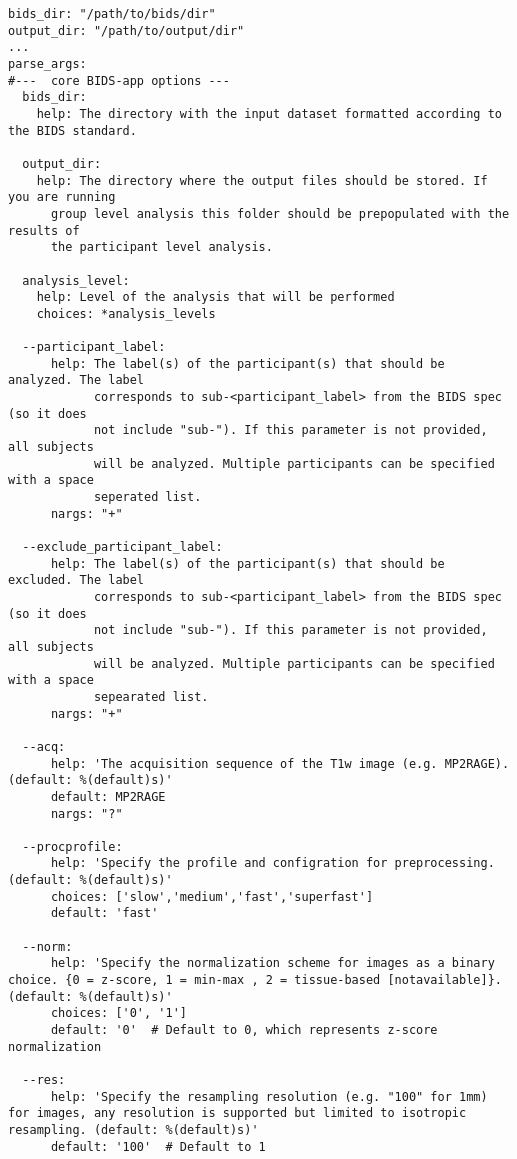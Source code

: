 \begin{verbatim}
bids_dir: "/path/to/bids/dir"
output_dir: "/path/to/output/dir"
...
parse_args:
#---  core BIDS-app options ---
  bids_dir:
    help: The directory with the input dataset formatted according to the BIDS standard.
  
  output_dir:
    help: The directory where the output files should be stored. If you are running
      group level analysis this folder should be prepopulated with the results of
      the participant level analysis.
      
  analysis_level:
    help: Level of the analysis that will be performed
    choices: *analysis_levels

  --participant_label:
      help: The label(s) of the participant(s) that should be analyzed. The label
            corresponds to sub-<participant_label> from the BIDS spec (so it does
            not include "sub-"). If this parameter is not provided, all subjects
            will be analyzed. Multiple participants can be specified with a space
            seperated list.
      nargs: "+"

  --exclude_participant_label:
      help: The label(s) of the participant(s) that should be excluded. The label
            corresponds to sub-<participant_label> from the BIDS spec (so it does
            not include "sub-"). If this parameter is not provided, all subjects
            will be analyzed. Multiple participants can be specified with a space
            sepearated list.
      nargs: "+"

  --acq:
      help: 'The acquisition sequence of the T1w image (e.g. MP2RAGE). (default: %(default)s)'
      default: MP2RAGE
      nargs: "?"

  --procprofile:
      help: 'Specify the profile and configration for preprocessing. (default: %(default)s)'
      choices: ['slow','medium','fast','superfast']
      default: 'fast'

  --norm:
      help: 'Specify the normalization scheme for images as a binary choice. {0 = z-score, 1 = min-max , 2 = tissue-based [notavailable]}. (default: %(default)s)'
      choices: ['0', '1']
      default: '0'  # Default to 0, which represents z-score normalization

  --res:
      help: 'Specify the resampling resolution (e.g. "100" for 1mm) for images, any resolution is supported but limited to isotropic resampling. (default: %(default)s)'
      default: '100'  # Default to 1 
    

\end{verbatim}
